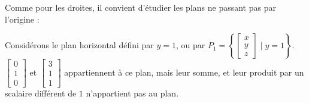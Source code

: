 Comme pour les droites, il convient d'étudier les plans ne passant pas par l'origine :

Considérons le plan horizontal défini par $y=1$, ou par $P_1=\left\{\begin{bmatrix}x\\y\\z\end{bmatrix} \mid y = 1\right\}$. $\begin{bmatrix}0\\1\\0\end{bmatrix}$ et $\begin{bmatrix}3\\1\\1\end{bmatrix}$ appartiennent à ce plan, mais leur somme, et leur produit par un scalaire différent de $1$ n'appartient pas au plan.

